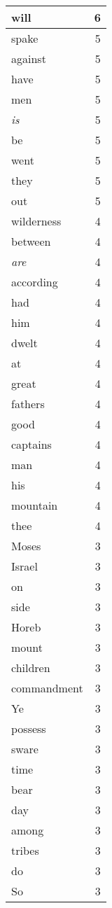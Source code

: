 \begin{center}
\begin{longtable}{l|r}
will & 6 \\ \hline
spake & 5 \\ \hline
against & 5 \\ \hline
have & 5 \\ \hline
men & 5 \\ \hline
\emph{is} & 5 \\ \hline
be & 5 \\ \hline
went & 5 \\ \hline
they & 5 \\ \hline
out & 5 \\ \hline
wilderness & 4 \\ \hline
between & 4 \\ \hline
\emph{are} & 4 \\ \hline
according & 4 \\ \hline
had & 4 \\ \hline
him & 4 \\ \hline
dwelt & 4 \\ \hline
at & 4 \\ \hline
great & 4 \\ \hline
fathers & 4 \\ \hline
good & 4 \\ \hline
captains & 4 \\ \hline
man & 4 \\ \hline
his & 4 \\ \hline
mountain & 4 \\ \hline
thee & 4 \\ \hline
Moses & 3 \\ \hline
Israel & 3 \\ \hline
on & 3 \\ \hline
side & 3 \\ \hline
Horeb & 3 \\ \hline
mount & 3 \\ \hline
children & 3 \\ \hline
commandment & 3 \\ \hline
Ye & 3 \\ \hline
possess & 3 \\ \hline
sware & 3 \\ \hline
time & 3 \\ \hline
bear & 3 \\ \hline
day & 3 \\ \hline
among & 3 \\ \hline
tribes & 3 \\ \hline
do & 3 \\ \hline
So & 3 \\ \hline

\end{longtable}
\end{center}
